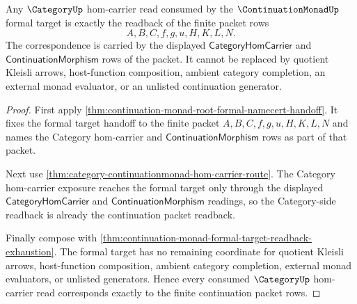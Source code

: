 \begin{theorem}
\label{thm:continuation-monad-category-hom-readback-correspondence}
Any $\CategoryUp$ hom-carrier read consumed by the $\ContinuationMonadUp$ formal target is exactly the readback of the finite packet rows
$$
A,B,C,f,g,u,H,K,L,N.
$$
The correspondence is carried by the displayed $\mathsf{CategoryHomCarrier}$ and $\mathsf{ContinuationMorphism}$ rows of the packet. It cannot be replaced by quotient Kleisli arrows, host-function composition, ambient category completion, an external monad evaluator, or an unlisted continuation generator.
\end{theorem}
\begin{proof}
First apply \autoref{thm:continuation-monad-root-formal-namecert-handoff}. It fixes the formal target handoff to the finite packet $A,B,C,f,g,u,H,K,L,N$ and names the Category hom-carrier and $\mathsf{ContinuationMorphism}$ rows as part of that packet.

Next use \autoref{thm:category-continuationmonad-hom-carrier-route}. The Category hom-carrier exposure reaches the formal target only through the displayed $\mathsf{CategoryHomCarrier}$ and $\mathsf{ContinuationMorphism}$ readings, so the Category-side readback is already the continuation packet readback.

Finally compose with \autoref{thm:continuation-monad-formal-target-readback-exhaustion}. The formal target has no remaining coordinate for quotient Kleisli arrows, host-function composition, ambient category completion, external monad evaluators, or unlisted generators. Hence every consumed $\CategoryUp$ hom-carrier read corresponds exactly to the finite continuation packet rows.
\end{proof}

